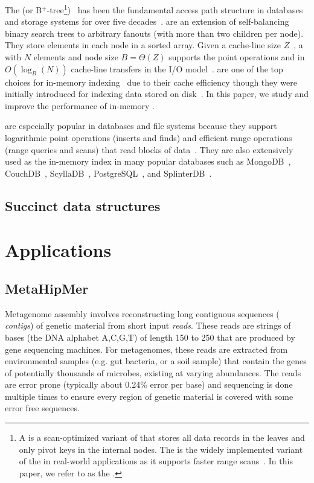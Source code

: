 The \btree(or B$^+$-tree\footnote{A \bplustree is a scan-optimized variant of
\btrees that stores all data records in the leaves and only pivot keys in the
internal nodes. The \bplustree is the widely implemented variant of the \btree
in real-world applications as it supports faster range
scans~\cite{mongodb,couchdb,scylladb,conway2020splinterdb,postgresql}. In this
paper, we refer to \bplustree as the \btree.})~\cite{BayerMc72} has been the
fundamental access path structure in databases and storage systems for over five
decades~\cite{Comer79,graefe2010survey}. \btrees are an extension of
self-balancing binary search trees to arbitrary fanouts (with more than two
children per node). They store elements in each node in a sorted array.  Given a
cache-line size $Z$~\cite{AggarwalVi88}, a \btree with $N$ elements and node
size $B = \Theta(Z)$ supports the point operations  and 
in $O(\log_B(N))$ cache-line transfers in the I/O model~\cite{AggarwalVi88}.
\btrees are one of the top choices for in-memory indexing~\cite{ZhangChOo15} due
to their cache efficiency though they were initially introduced for indexing
data stored on disk~\cite{BayerMc72}. In this paper, we study and improve the
performance of in-memory \btrees.

\btrees are especially popular in databases and file systems because they
support logarithmic point operations (inserts and finds) and efficient range
operations (range queries and scans) that read blocks of
data~\cite{Knuth98,rodeh2013btrfs}.  They are also extensively used as the
in-memory index in many popular databases such as MongoDB~\cite{mongodb},
CouchDB~\cite{couchdb}, ScyllaDB~\cite{scylladb}, PostgreSQL~\cite{postgresql},
and SplinterDB~\cite{conway2020splinterdb}.

\subsection{Succinct data structures}


\section{Applications}

\subsection{MetaHipMer}

Metagenome assembly involves reconstructing long contiguous sequences ({\it
contigs}) of genetic material from short input {\it reads}. These reads are
strings of bases (the DNA alphabet A,C,G,T) of length 150 to 250 that are
produced by gene sequencing machines.  For metagenomes, these reads are
extracted from environmental samples (e.g. gut bacteria, or a soil sample) that
contain the genes of potentially thousands of microbes, existing at varying
abundances.  The reads are error prone (typically about 0.24\% error per base)
and sequencing is done multiple times to ensure every region of genetic material
is covered with some error free sequences.

